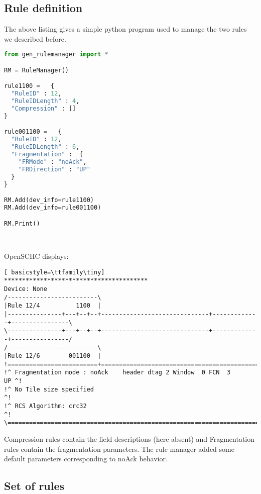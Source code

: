 \documentclass[onecolumn,12pt]{book}
\newcounter{c}
\begin{document}
\subsection{Rule definition}

The above listing gives a simple python program used to manage the two rules we described before. 


\begin{lstlisting}[language=Python]
from gen_rulemanager import *

RM = RuleManager()

rule1100 =   {
  "RuleID" : 12,
  "RuleIDLength" : 4,
  "Compression" : []
}

rule001100 =   {
  "RuleID" : 12,
  "RuleIDLength" : 6,
  "Fragmentation" :  {
    "FRMode" : "noAck",
    "FRDirection" : "UP"
  }
}

RM.Add(dev_info=rule1100)
RM.Add(dev_info=rule001100)

RM.Print()
\end{lstlisting}

~~


OpenSCHC displays:

\begin{lstlisting}[ basicstyle=\ttfamily\tiny]
****************************************
Device: None
/-------------------------\
|Rule 12/4          1100  |
|---------------+---+--+--+------------------------------+-------------+----------------\
\---------------+---+--+--+------------------------------+-------------+----------------/
/-------------------------\
|Rule 12/6        001100  |
!=========================+=============================================================\
!^ Fragmentation mode : noAck    header dtag 2 Window  0 FCN  3                     UP ^!
!^ No Tile size specified                                                              ^!
!^ RCS Algorithm: crc32                                                                ^!
\=======================================================================================/
\end{lstlisting}

Compression rules contain the field descriptions (here absent) and Fragmentation rules contain the fragmentation parameters. The rule manager added some default parameters corresponding to noAck behavior.


\subsection{Set of rules}
\end{document}
